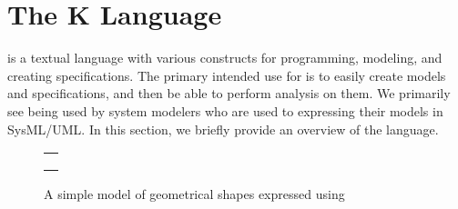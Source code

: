 \section{The K Language}

\Klang{} is a textual language with various constructs for
programming, modeling, and creating specifications. The primary
intended use for \Klang{} is to easily create models and
specifications, and then be able to perform analysis on them. We
primarily see \Klang{} being used by system modelers who are used to
expressing their models in SysML/UML. In this section, we briefly
provide an overview of the \Klang{} language.

\begin{figure}
\centering
\begin{tabular}{c}
\hline \\
 \\ \\
\hline
\end{tabular}
\caption{A simple model of geometrical shapes expressed using \Klang{}}
\label{fig:shapes}
\end{figure}


